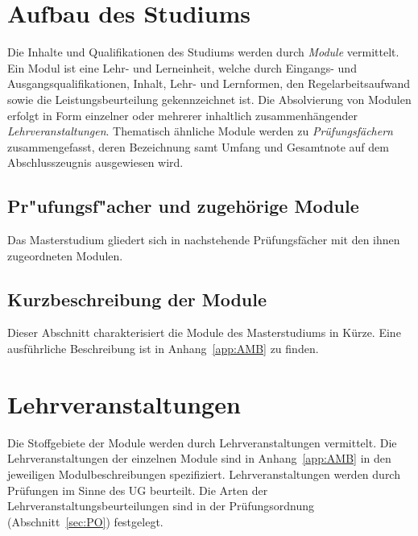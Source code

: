 %


\section{Aufbau des Studiums}\label{sec:AS}

Die Inhalte und Qualifikationen des Studiums werden durch
\emph{Module} vermittelt. Ein Modul ist eine Lehr- und Lerneinheit,
welche durch Eingangs- und Ausgangsqualifikationen, Inhalt, Lehr- und
Lernformen, den Regelarbeitsaufwand sowie die Leistungsbeurteilung
gekennzeichnet ist. Die Absolvierung von Modulen erfolgt in Form
einzelner oder mehrerer inhaltlich zusammenhängender
\emph{Lehrveranstaltungen}.  Thematisch ähnliche Module werden zu
\emph{Prüfungsfächern} zusammengefasst, deren Bezeichnung samt 
Umfang und Gesamtnote auf dem Abschlusszeugnis ausgewiesen wird.

\subsection*{Pr"ufungsf"acher und zugehörige Module}

Das Masterstudium \emph{} gliedert sich in 
nachstehende Prüfungsfächer mit den ihnen zugeordneten Modulen.

\subsection*{Kurzbeschreibung der Module}

Dieser Abschnitt charakterisiert die Module des Masterstudiums
\emph{} in Kürze. Eine ausführliche Beschreibung ist in
Anhang~\ref{app:AMB} zu finden.

%

\section{Lehrveranstaltungen}\label{sec:LVS}

Die Stoffgebiete der Module werden durch Lehrveranstaltungen
vermittelt.  Die Lehrveranstaltungen der einzelnen Module sind in
Anhang~\ref{app:AMB} in den jeweiligen Modulbeschreibungen
spezifiziert.  Lehrveranstaltungen werden durch Prüfungen im Sinne des
UG beurteilt.  Die Arten der Lehrveranstaltungsbeurteilungen sind in
der Prüfungsordnung (Abschnitt~\ref{sec:PO}) festgelegt.


